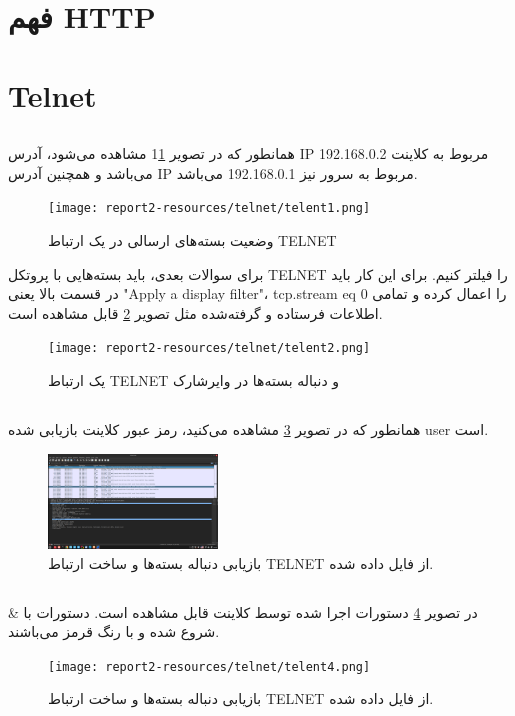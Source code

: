 \documentclass[12pt]{article}
\begin{document}
	\section{فهم \textenglish{HTTP}}
	
	\section{Telnet}
	\subsection{}
	همانطور که در تصویر 1\ref{tel:1} مشاهده می‌شود، آدرس IP مربوط به کلاینت 192.168.0.2 می‌باشد و همچنین آدرس IP مربوط به سرور نیز 192.168.0.1 می‌باشد.
	\begin{figure}[h]
		\centering
		\texttt{[image: report2-resources/telnet/telent1.png]}
		\caption{وضعیت بسته‌های ارسالی در یک ارتباط TELNET}
		\label{tel:1}
	\end{figure}
	برای سوالات بعدی، باید بسته‌هایی با پروتکل TELNET را فیلتر کنیم. 
	برای این کار باید در قسمت بالا یعنی "Apply a display filter"، tcp.stream eq 0 را اعمال کرده و تمامی اطلاعات فرستاده و گرفته‌شده مثل تصویر \ref{tel:2} قابل مشاهده است.
	\begin{figure}[h]
		\centering
		\texttt{[image: report2-resources/telnet/telent2.png]}
		\caption{یک ارتباط TELNET و دنباله بسته‌ها در وایرشارک}
		\label{tel:2}
	\end{figure}
	\subsection{}
	همانطور که در تصویر \ref{tel:3} مشاهده می‌کنید، رمز عبور کلاینت بازیابی شده user است.
	\begin{figure}[h]
		\centering
		\includegraphics[width=0.4\textwidth]{report2-resources/telnet/telent3.png}
		\caption{بازیابی دنباله بسته‌ها و ساخت ارتباط TELNET از فایل داده شده.}
		\label{tel:3}
	\end{figure}
	\subsection{}
	در تصویر \ref{tel:4} دستورات اجرا شده توسط کلاینت قابل مشاهده است. دستورات با \& شروع شده و با رنگ قرمز می‌باشند.
	\begin{figure}[h]
		\centering
		\texttt{[image: report2-resources/telnet/telent4.png]}
		\caption{بازیابی دنباله بسته‌ها و ساخت ارتباط TELNET از فایل داده شده.}
		\label{tel:4}
	\end{figure}
	
\end{document}
